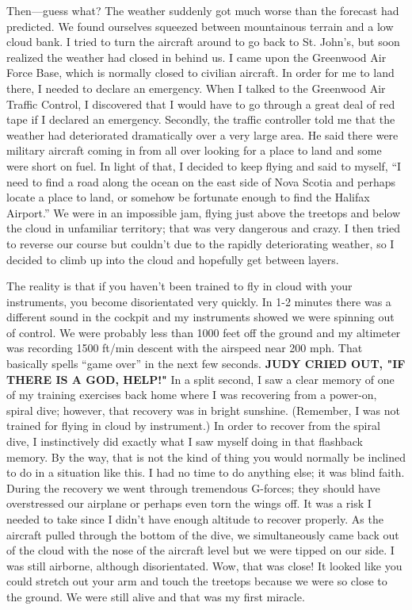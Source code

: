 \documentclass[oneside]{book}
\begin{document}
Then—guess what? The weather suddenly got much worse than the forecast had predicted. We found ourselves squeezed between mountainous terrain and a low cloud bank. I tried to turn the aircraft around to go back to St. John’s, but soon realized the weather had closed in behind us. I  came upon the Greenwood Air Force Base, which is normally closed to civilian aircraft. In order for me to land there, I needed to declare an emergency. When I talked to the Greenwood Air Traffic Control, I discovered that I would have to go through a great deal of red tape if I declared an emergency. Secondly, the traffic controller told me that the weather had deteriorated dramatically over a very large area. He said there were military aircraft coming in from all over looking for a place to land and some were short on fuel. In light of that, I decided to keep flying and said to myself, “I need to find a road along the ocean on the east side of Nova Scotia and perhaps locate a place to land, or somehow be fortunate enough to find the Halifax Airport.” We were in an impossible jam, flying just above the treetops and below the cloud in unfamiliar territory; that was very dangerous and crazy. I then tried to reverse our course but couldn’t due to the rapidly deteriorating weather, so I decided to climb up into the cloud and hopefully get between layers. 

The reality is that if you haven't been trained to fly in cloud with your instruments, you become disorientated very quickly. In 1-2 minutes there was a different sound in the cockpit and my instruments showed we were spinning out of control. We were probably less than 1000 feet off the ground and my altimeter was recording 1500 ft/min descent with the airspeed near 200 mph. That basically spells “game over” in the next few seconds. \textbf{JUDY CRIED OUT, "IF THERE IS A GOD, HELP!"} In a split second, I saw a clear memory of one of my training exercises back home where I was recovering from a power-on, spiral dive; however, that recovery was in bright sunshine. (Remember, I was not trained for flying in cloud by instrument.) In order to recover from the spiral dive, I instinctively did exactly what I saw myself doing in that flashback memory. By the way, that is not the kind of thing you would normally be inclined to do in a situation like this. I had no time to do anything else; it was blind faith. During the recovery we went through tremendous G-forces; they should have overstressed our airplane or perhaps even torn the wings off. It was a risk I needed to take since I didn’t have enough altitude to recover properly. As the aircraft pulled through the bottom of the dive, we simultaneously came back out of the cloud with the nose of the aircraft level but we were tipped on our side. I was still airborne, although disorientated. Wow, that was close! It looked like you could stretch out your arm and touch the treetops because we were so close to the ground. We were still alive and that was my first miracle. 
\end{document}
